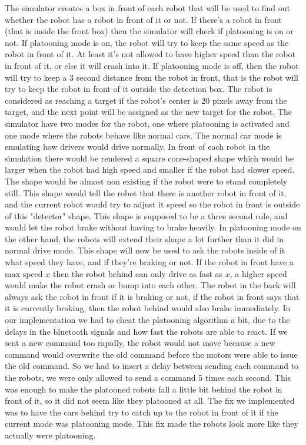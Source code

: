 The simulator creates a box in front of each robot that will be used to find out whether the robot has a robot in front of it or not. If there's a robot in front (that is inside the front box) then the simulator will check if platooning is on or not. If platooning mode is on, the robot will try to keep the same speed as the robot in front of it. At least it's not allowed to have higher speed than the robot in front of it, or else it will crash into it. If platooning mode is off, then the robot will try to keep a 3 second distance from the robot in front, that is the robot will try to keep the robot in front of it outside the detection box. The robot is considered as reaching a target if the robot's center is 20 pixels away from the target, and the next point will be assigned as the new target for the robot.
The simulator have two modes for the robot, one where platooning is activated and one mode where the robots behave like normal cars. The normal car mode is emulating how drivers would drive normally. In front of each robot in the simulation there would be rendered a square cone-shaped shape which would be larger when the robot had high speed and smaller if the robot had slower speed. The shape would be almost non existing if the robot were to stand completely still. This shape would tell the robot that there is another robot in front of it, and the current robot would try to adjust it speed so the robot in front is outside of this "detector" shape. This shape is supposed to be a three second rule, and would let the robot brake without having to brake heavily.
In platooning mode on the other hand, the robots will extend their shape a lot further than it did in normal drive mode. This shape will now be used to ask the robots inside of it what speed they have, and if they're braking or not.
If the robot in front have a max speed $x$ then the robot behind can only drive as fast as $x$, a higher speed would make the robot crash or bump into each other.
The robot in the back will always ask the robot in front if it is braking or not, if the robot in front says that it is currently braking, then the robot behind would also brake immediately.
In our implementation we had to cheat the platooning algorithm a bit, due to the delays in the bluetooth signals and how fast the robots are able to react. If we sent a new command too rapidly, the robot would not move because a new command would overwrite the old command before the motors were able to issue the old command. So we had to insert a delay between sending each command to the robots, we were only allowed to send a command 5 times each second. This was enough to make the platooned robots fall a little bit behind the robot in front of it, so it did not seem like they platooned at all. The fix we implemented was to have the cars behind try to catch up to the robot in front of it if the current mode was platooning mode. This fix made the robots look more like they actually were platooning.\\

